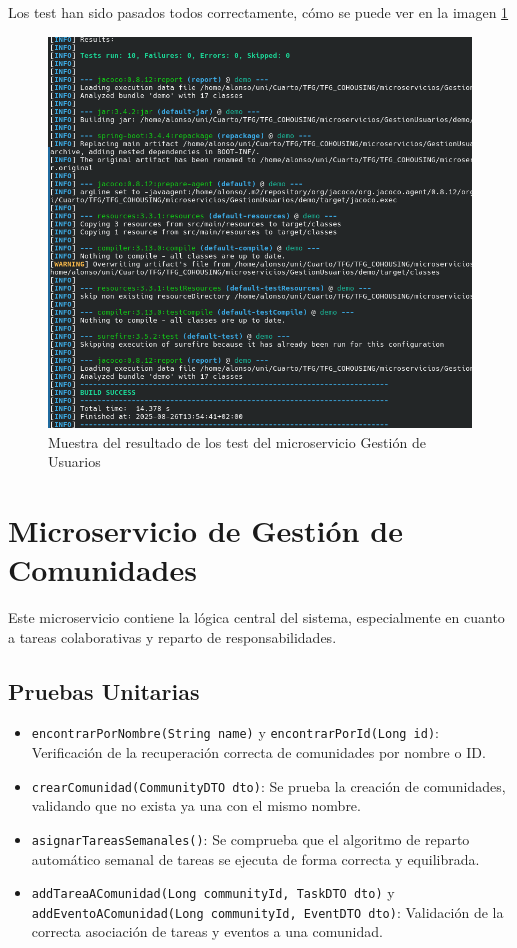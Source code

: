 Los test han sido pasados todos correctamente, cómo se puede ver en la imagen \ref{fig:test-result}
\begin{figure}[H]
  \centering
  \includegraphics[width=1\textwidth]{fotos/resultadotest-micro-GestionUsuarios.png}
  \caption{Muestra del resultado de los test del microservicio Gestión de Usuarios}
  \label{fig:test-result}
\end{figure}
\section{Microservicio de Gestión de Comunidades}
Este microservicio contiene la lógica central del sistema, especialmente en cuanto a tareas colaborativas y reparto de responsabilidades.

\subsection{Pruebas Unitarias}
\begin{itemize}
    \item \texttt{encontrarPorNombre(String name)} y \texttt{encontrarPorId(Long id)}: Verificación de la recuperación correcta de comunidades por nombre o ID.
    \item \texttt{crearComunidad(CommunityDTO dto)}: Se prueba la creación de comunidades, validando que no exista ya una con el mismo nombre.
    \item \texttt{asignarTareasSemanales()}: Se comprueba que el algoritmo de reparto automático semanal de tareas se ejecuta de forma correcta y equilibrada.
    \item \texttt{addTareaAComunidad(Long communityId, TaskDTO dto)} y \texttt{addEventoAComunidad(Long communityId, EventDTO dto)}: Validación de la correcta asociación de tareas y eventos a una comunidad.
\end{itemize}

